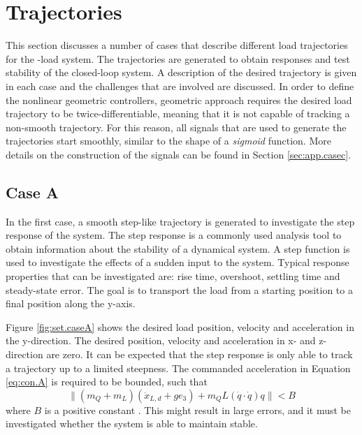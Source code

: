 \newcommand{\caseA}{71}
\newcommand{\caseB}{72}
\newcommand{\caseBB}{75}
\newcommand{\caseC}{78}
\newpage
\section{Trajectories}\label{sec:exp.traj}

This section discusses a number of cases that describe different load trajectories for the -load system.
The trajectories are generated to obtain responses and test stability of the closed-loop system. 
A description of the desired trajectory is given in each case and the challenges that are involved are discussed.
In order to define the nonlinear geometric controllers, geometric approach requires the desired load trajectory to be twice-differentiable, meaning that it is not capable of tracking a non-smooth trajectory. For this reason, all signals that are used to generate the trajectories start smoothly, similar to the shape of a \textit{sigmoid} function. More details on the construction of the signals can be found in Section \ref{sec:app.casec}.

\subsection*{Case A}
In the first case, a smooth step-like trajectory is generated to investigate the step response of the system.
The step response is a commonly used analysis tool to obtain information about the stability of a dynamical system.
A step function is used to investigate the effects of a sudden input to the system. 
Typical response properties that can be investigated are: rise time, overshoot, settling time and steady-state error.
The goal is to transport the load from a starting position to a final position along the y-axis. 

%

Figure \ref{fig:set.caseA} shows the desired load position, velocity and acceleration in the y-direction. 
The desired position, velocity and acceleration in x- and z-direction are zero.
It can be expected that the step response is only able to track a trajectory up to a limited steepness. 
The commanded acceleration in Equation \ref{eq:con.A} is required to be bounded, such that 
\begin{equation}\label{eq:set.acc}
\parallel (m_Q+m_L)(\ddot{x}_{L,d}+ge_3)+m_QL(\dot{q}\cdot\dot{q})q \parallel < B
\end{equation}
where $ B $ is a positive constant \cite{Lee2010}. 
This might result in large errors, and it must be investigated whether the system is able to maintain stable. 

